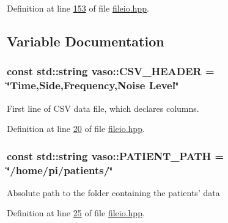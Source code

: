 Definition at line \hyperlink{fileio_8hpp_source_l00153}{153} of file \hyperlink{fileio_8hpp_source}{fileio.\+hpp}.



\subsection{Variable Documentation}
\hypertarget{namespacevaso_ade7cbcaad3dc577b643b3eea4b4e8aa0}{
\subsubsection[{C\+S\+V\+\_\+\+H\+E\+A\+D\+E\+R}]{\setlength{\rightskip}{0pt plus 5cm}const std\+::string vaso\+::\+C\+S\+V\+\_\+\+H\+E\+A\+D\+E\+R = \char`\"{}Time,{\bf Side},Frequency,Noise Level\char`\"{}}}\label{namespacevaso_ade7cbcaad3dc577b643b3eea4b4e8aa0}
First line of C\+S\+V data file, which declares columns. 

Definition at line \hyperlink{fileio_8hpp_source_l00020}{20} of file \hyperlink{fileio_8hpp_source}{fileio.\+hpp}.

\hypertarget{namespacevaso_a0f49c8240a13e7d853912ad78d5f53c9}{
\subsubsection[{P\+A\+T\+I\+E\+N\+T\+\_\+\+P\+A\+T\+H}]{\setlength{\rightskip}{0pt plus 5cm}const std\+::string vaso\+::\+P\+A\+T\+I\+E\+N\+T\+\_\+\+P\+A\+T\+H = \char`\"{}/home/pi/patients/\char`\"{}}}\label{namespacevaso_a0f49c8240a13e7d853912ad78d5f53c9}
Absolute path to the folder containing the patients' data 

Definition at line \hyperlink{fileio_8hpp_source_l00025}{25} of file \hyperlink{fileio_8hpp_source}{fileio.\+hpp}.

